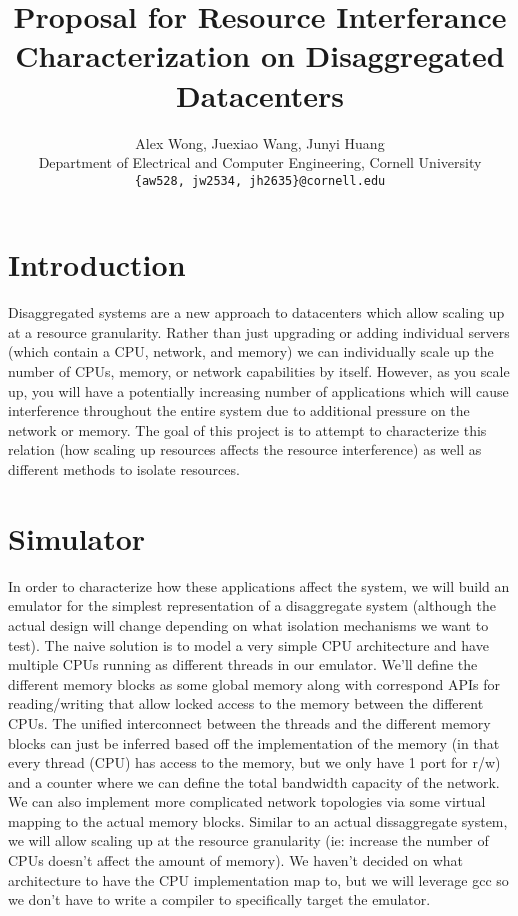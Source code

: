 \documentclass{article}
\title{Proposal for Resource Interferance Characterization on Disaggregated Datacenters}
\author{
    \vspace{6px}
    Alex Wong, Juexiao Wang, Junyi Huang \\
    Department of Electrical and Computer Engineering, Cornell University \\
    \texttt{\{aw528, jw2534, jh2635\}@cornell.edu}
}
\let\ACMmaketitle=\maketitle
\renewcommand{\maketitle}{\begingroup\let\footnote=\thanks\ACMmaketitle\endgroup}
\begin{document}
\maketitle

\onehalfspacing

\section{Introduction}
Disaggregated systems are a new approach to datacenters which allow scaling up at a resource granularity. Rather than just upgrading or adding individual servers (which contain a CPU, network, and memory) we can individually scale up the number of CPUs, memory, or network capabilities by itself. However, as you scale up, you will have a potentially increasing number of applications which will cause interference throughout the entire system due to additional pressure on the network or memory. The goal of this project is to attempt to characterize this relation (how scaling up resources affects the resource interference) as well as different methods to isolate resources.

\section{Simulator}
In order to characterize how these applications affect the system, we will build an emulator for the simplest representation of a disaggregate system (although the actual design will change depending on what isolation mechanisms we want to test). The naive solution is to model a very simple CPU architecture and have multiple CPUs running as different threads in our emulator. We'll define the different memory blocks as some global memory along with correspond APIs for reading/writing that allow locked access to the memory between the different CPUs. The unified interconnect between the threads and the different memory blocks can just be inferred based off the implementation of the memory (in that every thread (CPU) has access to the memory, but we only have 1 port for r/w) and a counter where we can define the total bandwidth capacity of the network. We can also implement more complicated network topologies via some virtual mapping to the actual memory blocks. Similar to an actual dissaggregate system, we will allow scaling up at the resource granularity (ie: increase the number of CPUs doesn't affect the amount of memory). We haven't decided on what architecture to have the CPU implementation map to, but we will leverage gcc so we don't have to write a compiler to specifically target the emulator.
\end{document}
